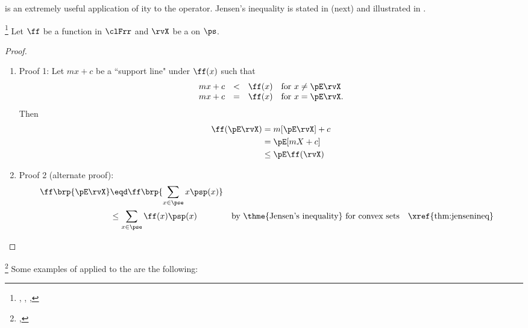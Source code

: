  is an extremely useful application of ity  to the
 operator.
Jensen's inequality is stated in  (next)
and illustrated in .
\begin{corollary}
\footnote{
  ,
  ,
  ,
  }
\label{cor:jensen}
Let $\ff$ be a function in $\clFrr$ and $\rvX$ be a  on $\ps$.
\end{corollary}
\begin{proof}
\begin{enumerate}
  \item Proof 1:
Let $mx+c$ be a ``support line" under $\ff(x)$  such that
\[
  \begin{array}{rcll}
    mx+c &<& \ff(x) & \mbox{for } x\ne \pE\rvX \\
    mx+c &=& \ff(x) & \mbox{for } x=\pE\rvX.
  \end{array}
\]
Then
\begin{align*}
  \ff(\pE\rvX)
    &=   m[\pE\rvX] + c
  \\&=   \pE[mX + c]
  \\&\le \pE\ff(\rvX)
\end{align*}

  \item Proof 2 (alternate proof):
    \begin{align*}
      \ff\brp{\pE\rvX}
        &\eqd \ff\brp{\sum_{x\in\pse} x \psp(x)}
      \\&\le \sum_{x\in\pse} \ff(x) \psp(x)
        && \text{by \thme{Jensen's inequality} for convex sets}
        && \text{\xref{thm:jensenineq}}
    \end{align*}
\end{enumerate}
\end{proof}

\begin{example}
\footnote{
  ,
  }
\label{ex:jensen}
Some examples of   applied to the 
are the following:
\end{example}

